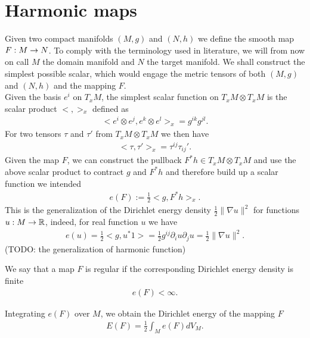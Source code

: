 \section{Harmonic maps}
\label{sec:preliminaries}

Given two compact manifolds $(M,g)$ and $(N,h)$ we define the smooth
map $F:M\rightarrow N$. To comply with the terminology used in literature, we
will from now on call $M$ the domain manifold and $N$ the target
manifold. We shall construct the simplest possible scalar,
which would engage the metric tensors of both $(M,g)$ and $(N,h)$ and the mapping $F$.\\
Given the basis $e^i$ on $T_x M$, the simplest scalar function on $T_x
M\otimes T_x M$ is the scalar product $<,>_x$ defined as
\begin{align}
  \label{eq:1}
  <e^i\otimes e^j,e^k\otimes e^l>_x=g^{ik}g^{jl}.
\end{align}
For two tensors $\tau$ and $\tau'$ from $T_x M\otimes T_x M$ we then
have
\begin{align}
  \label{eq:2}
  <\tau,\tau'>_x=\tau^{ij}\tau_{ij}'.
\end{align}
Given the map $F$, we can construct the pullback $F^*h\in T_x M\otimes
T_x M$ and use the above scalar product to contract $g$ and $F^* h$
and therefore build up a scalar function we intended
\begin{align}
  \label{eq:3}
  e(F):=\frac{1}{2}<g,F^*h>_x.
\end{align}
This is the generalization of the Dirichlet energy density
$\frac{1}{2}\lVert\nabla u\rVert^2$ for functions $u:M\rightarrow\mathbb{R}$,
indeed, for real function $u$ we have
\begin{align}
  \label{eq:4}
  e(u)=\frac{1}{2}<g,u^*1>=\frac{1}{2}g^{ij}\partial_i u\partial_j u
  =\frac{1}{2}\lVert\nabla u\rVert^2.
\end{align}
(TODO: the generalization of harmonic function)
\begin{definition}\label{def:regular-map}
  We say that a map $F$ is regular if the corresponding Dirichlet
  energy density is finite
  \begin{align}
    \label{eq:5}
    e(F)<\infty.
  \end{align}
\end{definition}

Integrating $e(F)$ over $M$, we obtain the Dirichlet energy of the
mapping $F$
\begin{align}\label{eq:En_general}
  E(F)=\frac{1}{2}\int_M e(F)dV_M.
\end{align}

